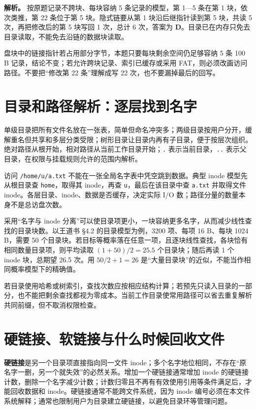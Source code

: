 \textbf{解析。} 按原题记录不跨块、每块容纳 5 条记录的模型，第 1---5 条在第 1 块，依次类推，第 22 条位于第 5 块。隐式链要从第 1 块沿后继指针读到第 5 块，共读 5 次，再把修改后的第 5 块写回 1 次，总计 6 次，答案为 \textbf{D}。目录已在内存只免去目录读取，不能免去沿链的数据块读取。

盘块中的链接指针若占用部分字节，本题只要每块剩余空间仍足够容纳 5 条 100 B 记录，结论不变；若允许跨块记录、索引已缓存或采用 FAT，则必须改画访问路径。不要把``修改第 22 条''理解成写 22 次，也不要漏掉最后的回写。

\section{目录和路径解析：逐层找到名字}\label{os-6-6}

单级目录把所有文件名放在一张表，简单但命名冲突多；两级目录按用户分开，缓解重名但共享和多层分类受限；树形目录让目录内再有子目录，便于按层次组织。绝对路径从根开始，相对路径从当前工作目录开始；\allowbreak{}\texttt{.} 表示当前目录，\allowbreak{}\texttt{..} 表示父目录，在权限与挂载规则允许的范围内解析。

访问 \allowbreak{}\texttt{/home/u/a.txt} 不能在一张全局名字表中凭空跳到数据。典型 inode 模型先从根目录查 \allowbreak{}\texttt{home}，取得其 inode，再查 \allowbreak{}\texttt{u}，最后在该目录中查 \allowbreak{}\texttt{a.txt} 并取得文件 inode。各层目录、inode、数据是否缓存，决定实际 I/O 数；路径分量的数量本身不是总访盘次数。

采用``名字与 inode 分离''可以使目录项更小，一块容纳更多名字，从而减少线性查找的目录块数。以王道书 §4.2 的目录模型为例，3200 项、每项 16 B、每块 1024 B，需要 50 个目录块。若目标等概率落在任意一项，且逐块线性查找，各块恰有相同数量目录项，则平均读取 \((1+50)/2=25.5\) 个目录块；随后再读 1 个 inode 块，总期望 26.5 次。用 \(50/2+1=26\) 是``大量目录块''的近似，不能当作相同概率模型下的精确值。

若目录使用哈希或树索引，查找次数应按相应结构计算；若预先只读入目录的一部分，也不能把剩余查找都视为零成本。当前工作目录使常用路径可以省去重复解析共同前缀，但不取消权限检查。

\section{硬链接、软链接与什么时候回收文件}\label{os-6-7}

\textbf{硬链接}是另一个目录项直接指向同一文件 inode；多个名字地位相同，不存在``原名字一删，另一个就失效''的必然关系。增加一个硬链接通常增加 inode 的硬链接计数，删除一个名字减少计数；计数归零且不再有有效使用引用等条件满足后，才能回收数据和 inode。硬链接通常不能跨文件系统，因为 inode 编号必须在本文件系统解释；通常也限制用户为目录建立硬链接，以避免目录环等管理问题。

